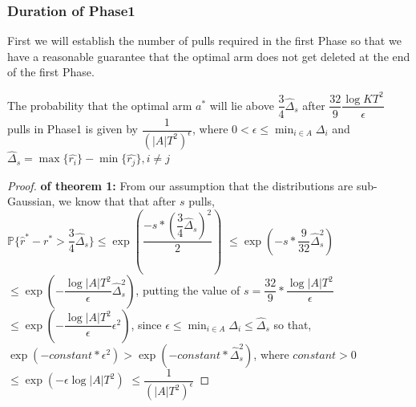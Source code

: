 \subsubsection{Duration of Phase1}
First we will establish the number of pulls required in the first Phase so that we have a reasonable guarantee that the optimal arm does not get deleted at the end of the first Phase.
\begin{theorem}
The probability that the optimal arm $a^{*}$ will lie above $\dfrac{3}{4}\hat{\Delta}_{s}$ after $\dfrac{32}{9}\dfrac{ \log KT^{2}}{\epsilon}$ pulls in Phase1 is given by $\dfrac{1}{(|A|T^{2})^{\epsilon}}$, where  $0 < \epsilon\leq \min_{i\in A}{\Delta_{i}}$ and $\hat{\Delta}_{s}= \max\lbrace\hat{r_{i}}\rbrace-\min\lbrace\hat{r_{j}}\rbrace,i\neq j$
\end{theorem}
\begin{proof} \textbf{of theorem 1:}
From our assumption that the distributions are sub-Gaussian, we know that that after $s$ pulls,
\newline
$\mathbb{P} \lbrace\hat{r}^{*}-r^{*}  > \dfrac{3}{4}\hat{\Delta}_{s}\rbrace \leq \exp(\dfrac{{-s*(\dfrac{3}{4}\hat{\Delta}_{s})^{2}}}{2}) $
\newline
\newline
\hspace*{8em} $\leq \exp(-s*\dfrac{9}{32}\hat{\Delta}_{s}^{2}) $
\newline
\hspace*{8em} $\leq \exp(-\dfrac{\log |A|T^{2}}{\epsilon}\hat{\Delta}_{s}^{2})$, putting the value of $s=\dfrac{32}{9}*\dfrac{\log|A|T^{2}}{\epsilon}$
\newline
\hspace*{8em} $\leq \exp(-\dfrac{\log |A|T^{2}}{\epsilon}\epsilon^{2})$, since $\epsilon\leq \min_{i\in A}{\Delta_{i}}\leq \hat{\Delta}_{s} $  so that, $ \exp(-constant*\epsilon^{2}) > \exp(-constant*\hat{\Delta}_{s}^{2})$, where $constant > 0$
\newline
\newline
\hspace*{8em} $\leq \exp(-\epsilon\log |A|T^{2})$
\newline
\newline
\hspace*{8em} $\leq \dfrac{1}{(|A|T^{2})^{\epsilon}}$
\end{proof}

